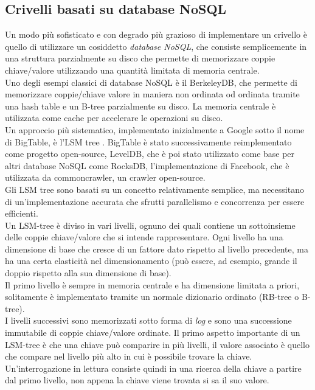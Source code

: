 \subsection{Crivelli basati su database NoSQL}
Un modo più sofisticato e con degrado più grazioso di implementare un crivello è quello di utilizzare un cosiddetto \textit{database NoSQL}, che consiste semplicemente in una struttura parzialmente su disco che permette di memorizzare coppie chiave/valore utilizzando una quantità limitata di memoria centrale.\\
Uno degli esempi classici di database NoSQL è il BerkeleyDB, che permette di memorizzare coppie/chiave valore in maniera non ordinata od ordinata tramite una hash table e un B-tree parzialmente su disco. La memoria centrale è utilizzata come cache per accelerare le operazioni su disco.\\
Un approccio più sistematico, implementato inizialmente a Google sotto il nome di BigTable, è l'LSM tree \cite{bigTable}.
BigTable è stato successivamente reimplementato come progetto open-source, LevelDB, che è poi stato utilizzato come base per altri database NoSQL come RocksDB, l'implementazione di Facebook, che è utilizzata da commoncrawler, un crawler open-source.\\
Gli LSM tree sono basati su un concetto relativamente semplice, ma necessitano di un'implementazione accurata che sfrutti parallelismo e concorrenza per essere efficienti.\\
Un LSM-tree è diviso in vari livelli, ognuno dei quali contiene un sottoinsieme delle coppie chiave/valore che si intende rappresentare. Ogni livello ha una dimensione di base che cresce di un fattore dato rispetto al livello precedente, ma ha una certa elasticità nel dimensionamento (può essere, ad esempio, grande il doppio rispetto alla sua dimensione di base).\\
Il primo livello è sempre in memoria centrale e ha dimensione limitata a priori, solitamente è implementato tramite un normale dizionario ordinato (RB-tree o B-tree).\\
I livelli successivi sono memorizzati sotto forma di \textit{log} e sono una successione immutabile di coppie chiave/valore ordinate.
Il primo aspetto importante di un LSM-tree è che una chiave può comparire in più livelli, il valore associato è quello che compare nel livello più alto in cui è possibile trovare la chiave. Un'interrogazione in lettura consiste quindi in una ricerca della chiave a partire dal primo livello, non appena la chiave viene trovata si sa il suo valore.\\
